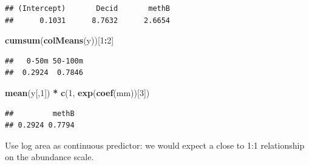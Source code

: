 \documentclass[12pt,]{book}
\newenvironment{Shaded}{\begin{snugshade}}{\end{snugshade}}
\newcommand{\DataTypeTok}[1]{\textcolor[rgb]{0.13,0.29,0.53}{#1}}
\newcommand{\DecValTok}[1]{\textcolor[rgb]{0.00,0.00,0.81}{#1}}
\newcommand{\FloatTok}[1]{\textcolor[rgb]{0.00,0.00,0.81}{#1}}
\newcommand{\KeywordTok}[1]{\textcolor[rgb]{0.13,0.29,0.53}{\textbf{#1}}}
\newcommand{\NormalTok}[1]{#1}
\newcommand{\OperatorTok}[1]{\textcolor[rgb]{0.81,0.36,0.00}{\textbf{#1}}}
\newcommand{\StringTok}[1]{\textcolor[rgb]{0.31,0.60,0.02}{#1}}
\begin{document}
\begin{verbatim}
## (Intercept)       Decid       methB 
##      0.1031      8.7632      2.6654
\end{verbatim}

\begin{Shaded}
\begin{Highlighting}[]
\KeywordTok{cumsum}\NormalTok{(}\KeywordTok{colMeans}\NormalTok{(y))[}\DecValTok{1}\OperatorTok{:}\DecValTok{2}\NormalTok{]}
\end{Highlighting}
\end{Shaded}

\begin{verbatim}
##   0-50m 50-100m 
##  0.2924  0.7846
\end{verbatim}

\begin{Shaded}
\begin{Highlighting}[]
\KeywordTok{mean}\NormalTok{(y[,}\DecValTok{1}\NormalTok{]) }\OperatorTok{*}\StringTok{ }\KeywordTok{c}\NormalTok{(}\DecValTok{1}\NormalTok{, }\KeywordTok{exp}\NormalTok{(}\KeywordTok{coef}\NormalTok{(mm))[}\DecValTok{3}\NormalTok{])}
\end{Highlighting}
\end{Shaded}

\begin{verbatim}
##         methB 
## 0.2924 0.7794
\end{verbatim}

Use log area as continuous predictor:
we would expect a close to 1:1 relationship on the
abundance scale.

\begin{Shaded}
\end{Shaded}
\end{document}
